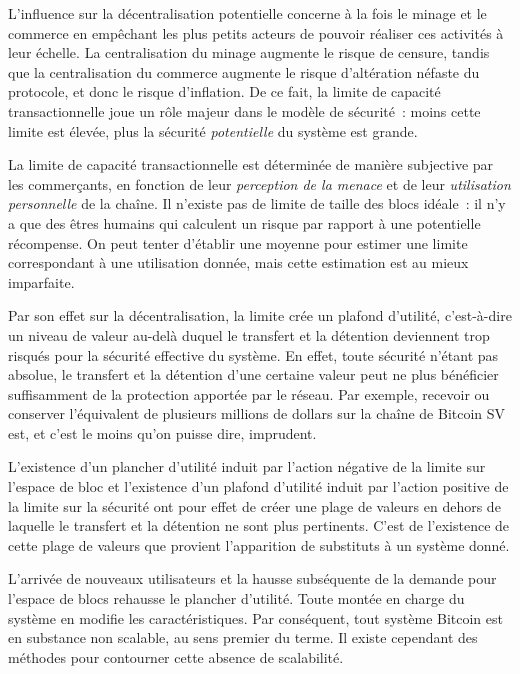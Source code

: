 L'influence sur la décentralisation potentielle concerne à la fois le minage et le commerce en empêchant les plus petits acteurs de pouvoir réaliser ces activités à leur échelle. La centralisation du minage augmente le risque de censure, tandis que la centralisation du commerce augmente le risque d'altération néfaste du protocole, et donc le risque d'inflation. De ce fait, la limite de capacité transactionnelle joue un rôle majeur dans le modèle de sécurité~: moins cette limite est élevée, plus la sécurité \emph{potentielle} du système est grande.

La limite de capacité transactionnelle est déterminée de manière subjective par les commerçants, en fonction de leur \emph{perception de la menace} et de leur \emph{utilisation personnelle} de la chaîne. Il n'existe pas de limite de taille des blocs idéale~: il n'y a que des êtres humains qui calculent un risque par rapport à une potentielle récompense. On peut tenter d'établir une moyenne pour estimer une limite correspondant à une utilisation donnée, mais cette estimation est au mieux imparfaite.

Par son effet sur la décentralisation, la limite crée un plafond d'utilité, c'est-à-dire un niveau de valeur au-delà duquel le transfert et la détention deviennent trop risqués pour la sécurité effective du système. En effet, toute sécurité n'étant pas absolue, le transfert et la détention d'une certaine valeur peut ne plus bénéficier suffisamment de la protection apportée par le réseau. Par exemple, recevoir ou conserver l'équivalent de plusieurs millions de dollars sur la chaîne de Bitcoin SV est, et c'est le moins qu'on puisse dire, imprudent.

L'existence d'un plancher d'utilité induit par l'action négative de la limite sur l'espace de bloc et l'existence d'un plafond d'utilité induit par l'action positive de la limite sur la sécurité ont pour effet de créer une plage de valeurs en dehors de laquelle le transfert et la détention ne sont plus pertinents. C'est de l'existence de cette plage de valeurs que provient l'apparition de substituts à un système donné.

L'arrivée de nouveaux utilisateurs et la hausse subséquente de la demande pour l'espace de blocs rehausse le plancher d'utilité. Toute montée en charge du système en modifie les caractéristiques. Par conséquent, tout système Bitcoin est en substance non scalable, au sens premier du terme. Il existe cependant des méthodes pour contourner cette absence de scalabilité.


